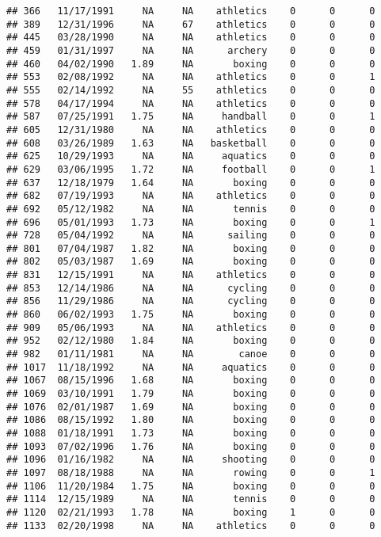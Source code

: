 \documentclass[]{article}
\begin{document}
\begin{verbatim}
## 366   11/17/1991     NA     NA    athletics    0      0      0
## 389   12/31/1996     NA     67    athletics    0      0      0
## 445   03/28/1990     NA     NA    athletics    0      0      0
## 459   01/31/1997     NA     NA      archery    0      0      0
## 460   04/02/1990   1.89     NA       boxing    0      0      0
## 553   02/08/1992     NA     NA    athletics    0      0      1
## 555   02/14/1992     NA     55    athletics    0      0      0
## 578   04/17/1994     NA     NA    athletics    0      0      0
## 587   07/25/1991   1.75     NA     handball    0      0      1
## 605   12/31/1980     NA     NA    athletics    0      0      0
## 608   03/26/1989   1.63     NA   basketball    0      0      0
## 625   10/29/1993     NA     NA     aquatics    0      0      0
## 629   03/06/1995   1.72     NA     football    0      0      1
## 637   12/18/1979   1.64     NA       boxing    0      0      0
## 682   07/19/1993     NA     NA    athletics    0      0      0
## 692   05/12/1982     NA     NA       tennis    0      0      0
## 696   05/01/1993   1.73     NA       boxing    0      0      1
## 728   05/04/1992     NA     NA      sailing    0      0      0
## 801   07/04/1987   1.82     NA       boxing    0      0      0
## 802   05/03/1987   1.69     NA       boxing    0      0      0
## 831   12/15/1991     NA     NA    athletics    0      0      0
## 853   12/14/1986     NA     NA      cycling    0      0      0
## 856   11/29/1986     NA     NA      cycling    0      0      0
## 860   06/02/1993   1.75     NA       boxing    0      0      0
## 909   05/06/1993     NA     NA    athletics    0      0      0
## 952   02/12/1980   1.84     NA       boxing    0      0      0
## 982   01/11/1981     NA     NA        canoe    0      0      0
## 1017  11/18/1992     NA     NA     aquatics    0      0      0
## 1067  08/15/1996   1.68     NA       boxing    0      0      0
## 1069  03/10/1991   1.79     NA       boxing    0      0      0
## 1076  02/01/1987   1.69     NA       boxing    0      0      0
## 1086  08/15/1992   1.80     NA       boxing    0      0      0
## 1088  01/18/1991   1.73     NA       boxing    0      0      0
## 1093  07/02/1996   1.76     NA       boxing    0      0      0
## 1096  01/16/1982     NA     NA     shooting    0      0      0
## 1097  08/18/1988     NA     NA       rowing    0      0      1
## 1106  11/20/1984   1.75     NA       boxing    0      0      0
## 1114  12/15/1989     NA     NA       tennis    0      0      0
## 1120  02/21/1993   1.78     NA       boxing    1      0      0
## 1133  02/20/1998     NA     NA    athletics    0      0      0

\end{verbatim}
\end{document}
